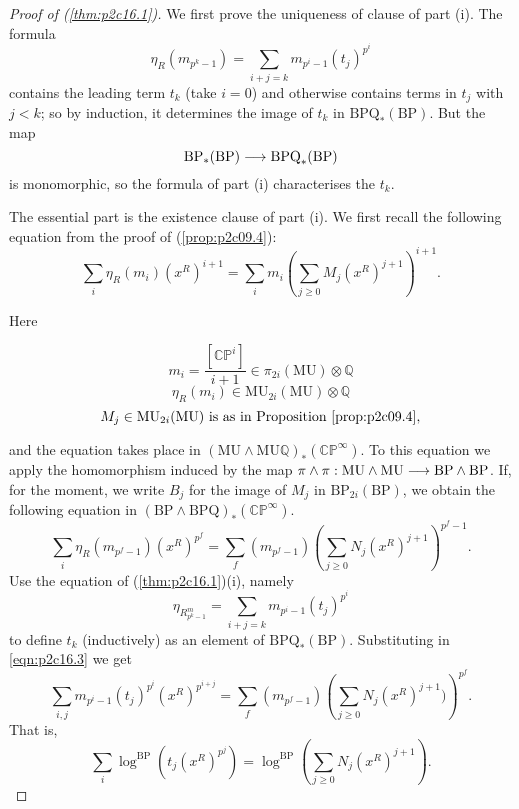 \documentclass[../main]{subfiles}
\begin{document}
\begin{proof}[Proof of (\ref{thm:p2c16.1})]
We first prove the uniqueness of clause of part (i). The formula $$\eta_R (m_{p^k - 1}) = \sum_{i + j = k} m_{p^i - 1} (t_j)^{p^i}$$ contains the leading term $t_k$ (take $i = 0$) and otherwise contains terms in $t_j$ with $j < k$; so by induction, it determines the image of $t_k$ in $\mathrm {BPQ}_\ast(\mathrm {BP})$. But the map $$\mathrm {BP}_\ast(\mathrm {BP}) \overset{}{\longrightarrow} \mathrm{BPQ}_\ast(\mathrm{BP})$$ is monomorphic, so the formula of part (i) characterises the $t_k$. 

The essential part is the existence clause of part (i). We first recall the following equation from the proof of (\ref{prop:p2c09.4}): 
\begin{equation}
\tag{16.2}
\label{eqn:p2c16.2}
\sum_i \eta_R (m_i) (x^R)^{i + 1} = \sum_i m_i \left(\sum_{j \ge 0} M_j (x^R)^{j + 1}\right)^{i + 1}.
\end{equation}

Here

$$m_i = \frac {[\mathbb {CP}^i]} {i + 1} \in \pi_{2i} (\mathrm {MU}) \otimes \mathbb Q$$
$$\eta_R(m_i) \in \mathrm{MU}_{2i}(\mathrm{MU}) \otimes \mathbb Q$$
$$M_j \in \mathrm{MU}_{2i}(\mathrm{MU}) \text { is as in Proposition } \ref{prop:p2c09.4},$$

and the equation takes place in $(\mathrm {MU} \wedge \mathrm {MU} \mathbb Q)_\ast(\mathbb {CP}^\infty)$. To this equation we apply the homomorphism induced by the map $\pi \wedge \pi : \mathrm {MU} \wedge \mathrm{MU} \overset{}{\longrightarrow} \mathrm{BP} \wedge \mathrm{BP}$. If, for the moment, we write $B_j$ for the image of $M_j$ in $\mathrm {BP}_{2i} (\mathrm {BP})$, we obtain the following equation in $(\mathrm {BP} \wedge \mathrm {BPQ})_\ast (\mathbb {CP}^\infty)$.
\begin{equation}
\tag{16.3}
\label{eqn:p2c16.3}
\sum_i \eta_R (m_{p^f - 1}) (x^R)^{p^f} = \sum_f (m_{p^f - 1}) \left(\sum_{j \ge 0} N_j (x^R)^{j + 1}\right)^{p^f - 1}.
\end{equation}
Use the equation of (\ref{thm:p2c16.1})(i), namely $$\eta_{R^m_{p^k - 1}} = \sum_{i + j = k} m_{p^i - 1} (t_j)^{p^i}$$ to define $t_k$ (inductively) as an element of $\mathrm {BPQ}_*(\mathrm {BP})$. Substituting in \eqref{eqn:p2c16.3} we get $$\sum_{i, j} m_{p^i - 1} (t_j)^{p^i} (x^R)^{p^{i + j}} = \sum_f (m_{p^f - 1}) \left(\sum_{j \ge 0} N_j (x^R)^{j + 1})\right)^{p^f}.$$ 
That is, $$\sum_i \log^{\mathrm{BP}} (t_j (x^R)^{p^j}) = \log^{\mathrm{BP}} \left(\sum_{j \ge 0} N_j (x^R)^{j + 1}\right).$$


\end{proof}
\end{document}
